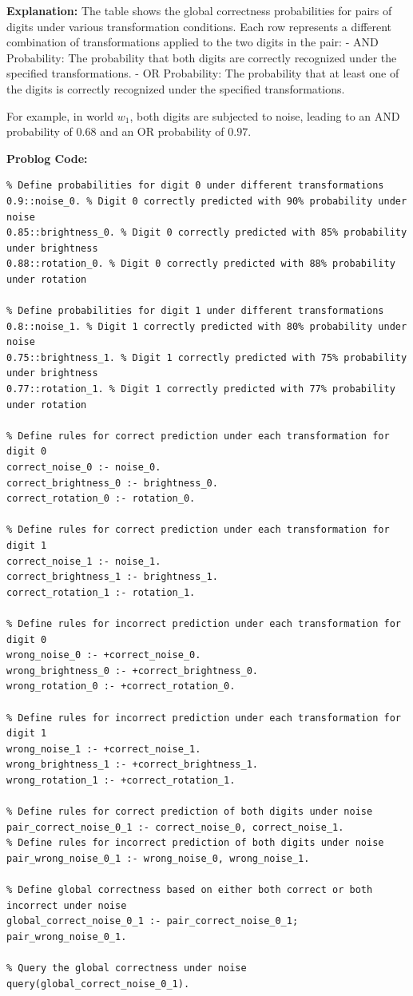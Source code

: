 \textbf{Explanation:} The table shows the global correctness probabilities for pairs of digits under various transformation conditions. Each row represents a different combination of transformations applied to the two digits in the pair:
- AND Probability: The probability that both digits are correctly recognized under the specified transformations.
- OR Probability: The probability that at least one of the digits is correctly recognized under the specified transformations.

For example, in world $w_1$, both digits are subjected to noise, leading to an AND probability of $0.68$ and an OR probability of $0.97$.

\textbf{Problog Code:}
\begin{mdframed}[leftline=false, rightline=false, topline=true, bottomline=true]
\scriptsize
\begin{verbatim}
% Define probabilities for digit 0 under different transformations
0.9::noise_0. % Digit 0 correctly predicted with 90% probability under noise
0.85::brightness_0. % Digit 0 correctly predicted with 85% probability under brightness
0.88::rotation_0. % Digit 0 correctly predicted with 88% probability under rotation

% Define probabilities for digit 1 under different transformations
0.8::noise_1. % Digit 1 correctly predicted with 80% probability under noise
0.75::brightness_1. % Digit 1 correctly predicted with 75% probability under brightness
0.77::rotation_1. % Digit 1 correctly predicted with 77% probability under rotation

% Define rules for correct prediction under each transformation for digit 0
correct_noise_0 :- noise_0.
correct_brightness_0 :- brightness_0.
correct_rotation_0 :- rotation_0.

% Define rules for correct prediction under each transformation for digit 1
correct_noise_1 :- noise_1.
correct_brightness_1 :- brightness_1.
correct_rotation_1 :- rotation_1.

% Define rules for incorrect prediction under each transformation for digit 0
wrong_noise_0 :- +correct_noise_0.
wrong_brightness_0 :- +correct_brightness_0.
wrong_rotation_0 :- +correct_rotation_0.

% Define rules for incorrect prediction under each transformation for digit 1
wrong_noise_1 :- +correct_noise_1.
wrong_brightness_1 :- +correct_brightness_1.
wrong_rotation_1 :- +correct_rotation_1.

% Define rules for correct prediction of both digits under noise
pair_correct_noise_0_1 :- correct_noise_0, correct_noise_1.
% Define rules for incorrect prediction of both digits under noise
pair_wrong_noise_0_1 :- wrong_noise_0, wrong_noise_1.

% Define global correctness based on either both correct or both incorrect under noise
global_correct_noise_0_1 :- pair_correct_noise_0_1; pair_wrong_noise_0_1.

% Query the global correctness under noise
query(global_correct_noise_0_1).
\end{verbatim}
\end{mdframed}


